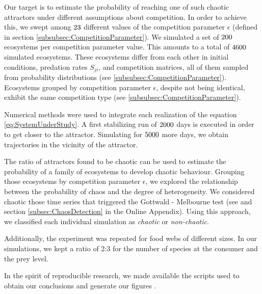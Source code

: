 Our target is to estimate the probability of reaching one of such chaotic attractors under different assumptions about competition. In order to achieve this, we swept among $23$ different values of the competition parameter $\epsilon$ (defined in section \ref{subsubsec:CompetitionParameter}). We simulated a set of $200$ ecosystems per competition parameter value. This amounts to a total of $4600$ simulated ecosystems. These ecosystems differ from each other in initial conditions, predation rates $S_{ji}$, and competition matrices, all of them sampled from probability distributions (see \ref{subsubsec:CompetitionParameter}). Ecosystems grouped by competition parameter $\epsilon$, despite not being identical, exhibit the same competition type (see \ref{subsubsec:CompetitionParameter}).

Numerical methods were used to integrate each realization of the equation \ref{eq:SystemUnderStudy}. A first stabilizing run of $ 2000 $ days is executed in order to get closer to the attractor. Simulating for $ 5000 $ more days, we obtain trajectories in the vicinity of the attractor.

The ratio of attractors found to be chaotic can be used to estimate the probability of a family of ecosystems to develop chaotic behaviour. Grouping those ecosystems by competition parameter $\epsilon$, we explored the relationship between the probability of chaos and the degree of heterogeneity. We considered chaotic those time series that triggered the Gottwald - Melbourne test (see \citet{Gottwald2009} and section \ref{subsec:ChaosDetection} in the Online Appendix). Using this approach, we classified each individual simulation as \textit{chaotic} or \textit{non-chaotic}.

Additionally, the experiment was repeated for food webs of different sizes. In our simulations, we kept a ratio of 2:3 for the number of species at the consumer and the prey level.

In the spirit of reproducible research, we made available the scripts used to obtain our conclusions and generate our figures \citep{Rodriguez-Sanchez-code-neuchaos}.
